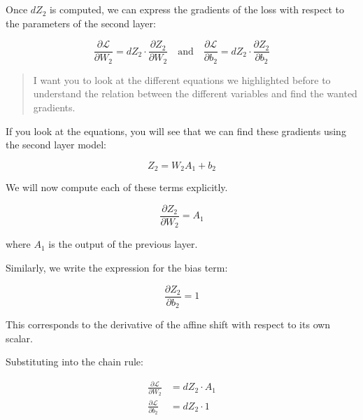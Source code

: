 \documentclass[11pt]{article}
\begin{document}
\vspace{2em}

\section*{}

Once \( dZ_2 \) is computed, we can express the gradients of the loss with respect to the parameters of the second layer:

\[
\boxed{
\frac{\partial \mathcal{L}}{\partial W_2} = dZ_2 \cdot \frac{\partial Z_2}{\partial W_2}
}
\quad \text{and} \quad
\boxed{
\frac{\partial \mathcal{L}}{\partial b_2} = dZ_2 \cdot \frac{\partial Z_2}{\partial b_2}
}
\]

\vspace{1em}

\begin{quote}
I want you to look at the different equations we highlighted before to understand the relation between the different variables and find the wanted gradients.
\end{quote}

If you look at the equations, you will see that we can find these gradients using the second layer model:

\[
Z_2 = W_2 A_1 + b_2
\]

We will now compute each of these terms explicitly.

\[
\frac{\partial Z_2}{\partial W_2} = A_1
\]

where \( A_1 \) is the output of the previous layer.

\vspace{0.5em}

Similarly, we write the expression for the bias term:

\[
\frac{\partial Z_2}{\partial b_2} = 1
\]

This corresponds to the derivative of the affine shift with respect to its own scalar.

\vspace{1em}

Substituting into the chain rule:

\[
\begin{aligned}
\frac{\partial \mathcal{L}}{\partial W_2} &= dZ_2 \cdot A_1 \\
\frac{\partial \mathcal{L}}{\partial b_2} &= dZ_2 \cdot 1
\end{aligned}
\]
\end{document}
